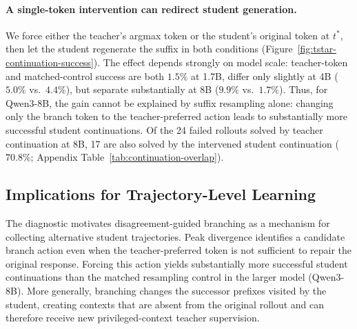 \paragraph{A single-token intervention can redirect student generation.}
We force either the teacher's argmax token or the student's original token at $t^*$, then let the student regenerate the suffix in both conditions (Figure~\ref{fig:tstar-continuation-success}). The effect depends strongly on model scale: teacher-token and matched-control success are both $1.5\%$ at 1.7B, differ only slightly at 4B ($5.0\%$ vs.\ $4.4\%$), but separate substantially at 8B ($9.9\%$ vs.\ $1.7\%$). Thus, for Qwen3-8B, the gain cannot be explained by suffix resampling alone: changing only the branch token to the teacher-preferred action leads to substantially more successful student continuations. Of the 24 failed rollouts solved by teacher continuation at 8B, 17 are also solved by the intervened student continuation ($70.8\%$; Appendix Table~\ref{tab:continuation-overlap}).


\subsection{Implications for Trajectory-Level Learning}
\label{sec:analysis-bridge}



The diagnostic motivates disagreement-guided branching as a mechanism for collecting alternative student trajectories. Peak divergence identifies a candidate branch action even when the teacher-preferred token is not sufficient to repair the original response. Forcing this action yields substantially more successful student continuations than the matched resampling control in the larger model (Qwen3-8B). More generally, branching changes the successor prefixes visited by the student, creating contexts that are absent from the original rollout and can therefore receive new privileged-context teacher supervision.
